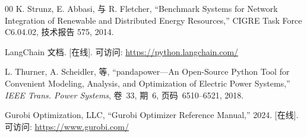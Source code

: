 \documentclass[conference]{IEEEtran}
\begin{document}
\begin{thebibliography}{00}
K. Strunz, E. Abbasi, 与 R. Fletcher, ``Benchmark Systems for Network Integration of Renewable and Distributed Energy Resources,''
CIGRE Task Force C6.04.02, 技术报告 575, 2014.

LangChain 文档. [在线]. 可访问: \url{https://python.langchain.com/}

L. Thurner, A. Scheidler, 等, ``pandapower---An Open-Source Python Tool for Convenient Modeling, Analysis, and Optimization of Electric Power Systems,''
\emph{IEEE Trans. Power Systems}, 卷~33, 期~6, 页码~6510--6521, 2018.

Gurobi Optimization, LLC, ``Gurobi Optimizer Reference Manual,'' 2024. [在线]. 可访问: \url{https://www.gurobi.com/}

\end{thebibliography}
\end{document}
